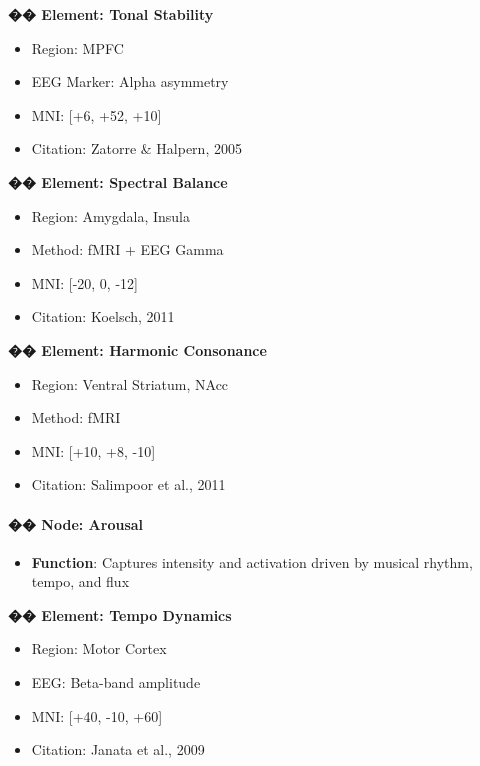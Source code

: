 \documentclass[10pt]{article}
\begin{document}
\textbf{�� Element: Tonal Stability}

\begin{itemize}
    \item Region: MPFC
    \item EEG Marker: Alpha asymmetry
    \item MNI: [+6, +52, +10]
    \item Citation: Zatorre \& Halpern, 2005
\end{itemize}

\textbf{�� Element: Spectral Balance}

\begin{itemize}
    \item Region: Amygdala, Insula
    \item Method: fMRI + EEG Gamma
    \item MNI: [-20, 0, -12]
    \item Citation: Koelsch, 2011
\end{itemize}

\textbf{�� Element: Harmonic Consonance}

\begin{itemize}
    \item Region: Ventral Striatum, NAcc
    \item Method: fMRI
    \item MNI: [+10, +8, -10]
    \item Citation: Salimpoor et al., 2011
\end{itemize}

\paragraph{�� Node: Arousal}

\begin{itemize}
    \item \textbf{Function}: Captures intensity and activation driven by musical rhythm, tempo, and flux
\end{itemize}

\textbf{�� Element: Tempo Dynamics}

\begin{itemize}
    \item Region: Motor Cortex
    \item EEG: Beta-band amplitude
    \item MNI: [+40, -10, +60]
    \item Citation: Janata et al., 2009
\end{itemize}
\end{document}
